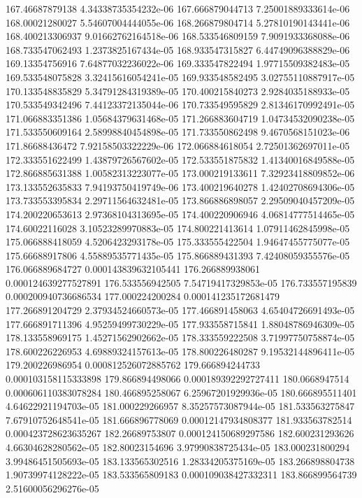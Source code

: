 {167.46687879138 4.34338735354232e-06
167.666879044713 7.25001889333614e-06
168.00021280027 5.54607004444055e-06
168.266879804714 5.27810190143441e-06
168.400213306937 9.01662762164518e-06
168.533546809159 7.9091933368088e-06
168.733547062493 1.2373825167434e-05
168.933547315827 6.44749096388829e-06
169.13354756916 7.64877032236022e-06
169.333547822494 1.97715509382483e-05
169.533548075828 3.32415616054241e-05
169.933548582495 3.02755110887917e-05
170.133548835829 5.34791284319389e-05
170.400215840273 2.9284035188933e-05
170.533549342496 7.44123372135044e-06
170.733549595829 2.81346170992491e-05
171.066883351386 1.05684379631468e-05
171.266883604719 1.04734532090238e-05
171.533550609164 2.58998840454898e-05
171.733550862498 9.4670568151023e-06
171.86688436472 7.92158503322229e-06
172.066884618054 2.72501362697011e-05
172.333551622499 1.43879726567602e-05
172.533551875832 1.41340016849588e-05
172.866885631388 1.00582313223077e-05
173.000219133611 7.32923418809852e-06
173.133552635833 7.94193750419749e-06
173.400219640278 1.42402708694306e-05
173.733553395834 2.29711564632481e-05
173.866886898057 2.29509040457209e-05
174.200220653613 2.97368104313695e-05
174.400220906946 4.06814777514465e-05
174.60022116028 3.10523289970883e-05
174.800221413614 1.07911462845998e-05
175.066888418059 4.5206423293178e-05
175.333555422504 1.94647455775077e-05
175.66688917806 4.55889535771435e-05
175.866889431393 7.42408059355576e-05
176.066889684727 0.000143839632105441
176.266889938061 0.000124639277527891
176.533556942505 7.54719417329853e-05
176.733557195839 0.000200940736686534
177.000224200284 0.000141235172681479
177.266891204729 2.37934524660573e-05
177.466891458063 4.65404726691493e-05
177.666891711396 4.95259499730229e-05
177.933558715841 1.88048786946309e-05
178.133558969175 1.45271562902662e-05
178.333559222508 3.71997750758874e-05
178.600226226953 4.69889324157613e-05
178.800226480287 9.19532144896411e-05
179.200226986954 0.000812526072885762
179.666894244733 0.000103158115333898
179.866894498066 0.000189392292727411
180.0668947514 0.000606110383078284
180.466895258067 6.25967201929936e-05
180.666895511401 4.64622921194703e-05
181.000229266957 8.35257573087944e-05
181.533563275847 7.67910752648541e-05
181.666896778069 0.00012147934808377
181.933563782514 0.000423728623635267
182.26689753807 0.000124150689297586
182.600231293626 4.66304628280562e-05
182.80023154696 3.97990838725434e-05
183.000231800294 3.99486451505693e-05
183.133565302516 1.28334205375169e-05
183.266898804738 1.90739974128222e-05
183.533565809183 0.000109038427332311
183.866899564739 2.51600056296276e-05
}
